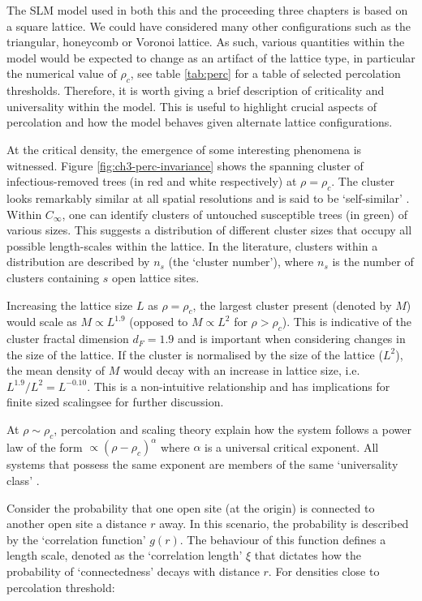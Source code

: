 The SLM model used in both this and the proceeding three chapters is based on a square lattice. %
We could have considered many other configurations such as the triangular, honeycomb or Voronoi lattice. %
As such, various quantities within the model would be expected to change as an artifact of the lattice type, %
in particular the numerical value of $\rho_c$, see table \ref{tab:perc} for a table of selected percolation thresholds. %
Therefore, it is worth giving a brief description of criticality and universality within the model. %
This is useful to highlight crucial aspects of percolation and how the model  behaves given alternate lattice configurations. %

At the critical density, the emergence of some interesting phenomena is witnessed. %
Figure \ref{fig:ch3-perc-invariance} shows the spanning cluster of infectious-removed trees (in red and white respectively) at $\rho =\rho_c$. %
The cluster looks remarkably similar at all spatial resolutions and is said to be `self-similar' \cite{Kapitulnik_1983}. %
Within $C_\infty$, one can identify clusters of untouched susceptible trees (in green) of various sizes. %
This suggests a distribution of different cluster sizes that occupy all possible length-scales within the lattice. %
In the literature, clusters within a distribution are described by $n_s$ (the `cluster number'), where $n_s$ is the number of clusters containing $s$ open lattice sites. %

Increasing the lattice size $L$ as $\rho = \rho_c$, the largest cluster present (denoted by $M$) would scale as $M\propto L^{1.9}$ (opposed to $M\propto L^{2}$ for $\rho > \rho_c$). %
This is indicative of the cluster fractal dimension $d_F=1.9$ and is important when considering changes in the size of the lattice. %
If the cluster is normalised by the size of the lattice ($L^2$), the mean density of $M$ would decay with an increase in lattice size, i.e. $L^{1.9}/L^2 = L^{-0.10}$. %
This is a non-intuitive relationship and has implications for finite sized scaling\textemdash see \cite{stauffer2018introduction} for further discussion. %

At $\rho \sim \rho_c$, percolation and scaling theory explain how the system follows a power law of the form $\propto (\rho - \rho_c)^{\alpha}$ where $\alpha$ is a universal critical exponent. %
All systems that possess the same exponent are members of the same `universality class' \cite{PhysRev.180.594, RevModPhys.76.663}. %

Consider the probability that one open site (at the origin) is connected to another open site a distance $r$ away. %
In this scenario, the probability is described by the `correlation function' $g(r)$. %
The behaviour of this function defines a length scale, denoted as the `correlation length' $\xi$ that dictates how the probability of `connectedness' decays with distance $r$. %
For densities close to percolation threshold: %

